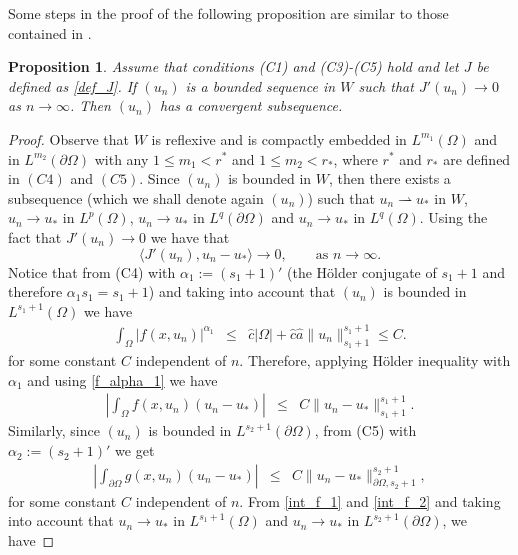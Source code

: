 \documentclass[pdflatex,sn-mathphys-num]{sn-jnl}
\theoremstyle{thmstyleone}%
\newtheorem{proposition}[theorem]{Proposition}%
\theoremstyle{thmstyletwo}%
\theoremstyle{thmstylethree}%
\theoremstyle{thmstylethree}%
\begin{document}
Some  steps in the proof of the following proposition are similar to those contained in \cite[Lemma 2.3]{CdFL}.
\begin{proposition}\label{bound-PS}
Assume that  conditions (C1) and (C3)-(C5) hold and let $J$ be defined as \eqref{def_J}. If $(u_n)$ is a bounded sequence in $W$ such  that $J'(u_n) \to 0$ as $n\to \infty$. Then  $(u_n)$ has a convergent subsequence.
\end{proposition}
\begin{proof}
    Observe that $W$ is reflexive  and is compactly embedded in $L^{m_1}(\Omega)$ and  in $ L^{m_2}(\partial\Omega)$ with any $1\le m_1<r^*$ and $1\le m_2<r_*$, where $r^*$ and $r_*$ are defined in $(C4)$ and $(C5)$. Since $(u_n)$ is bounded in $W$, then there exists a subsequence (which we shall denote again $(u_n)$) such that $u_n \rightharpoonup u_*$ in $W$, $u_n \to u_*$ in $L^p(\Omega)$, $u_n \to u_*$ in $L^q(\partial\Omega)$  and $u_n \to u_*$ in $L^q(\Omega)$.
 Using the fact that $J'(u_n)\to 0$ we have that 
 \begin{equation}\label{J'(u_n)}
     \langle J'(u_n), u_n-u_* \rangle \to 0,\qquad \text{as $n\to \infty$}.
 \end{equation}
Notice that from (C4)  with $\alpha_1:=(s_1+1)'$ (the Hölder conjugate of $s_1+1$ and therefore $\alpha_1 s_1=s_1+1$) and taking into account that $(u_n)$ is bounded in $L^{s_1+1}(\Omega)$ we have
 \begin{eqnarray}\label{f_alpha_1}
     \int_\Omega |f(x,u_n)|^{\alpha_1}  
     &\leqslant & \hat{c}|\Omega|+\hat{c}\hat{a}\|u_n\|_{s_1+1}^{s_1+1}\leqslant C. 
 \end{eqnarray}
 for some constant $C$ independent of $n$.
 Therefore, applying Hölder inequality with $\alpha_1$ and using \eqref{f_alpha_1} we have
 \begin{eqnarray}\label{int_f_1}
\left|     \int_{\Omega} f(x, u_n) (u_n-u_*)  \right| 
&\leqslant & C\|u_n-u_*\|_{s_1+1}^{s_1+1} .
 \end{eqnarray}
Similarly, since $(u_n)$ is bounded in $L^{s_2+1}(\partial \Omega)$, from (C5) with $\alpha_2:=(s_2+1)'$ we get 
 \begin{eqnarray}\label{int_f_2}
\left|     \int_{\partial\Omega} g(x, u_n) (u_n-u_*)  \right| 
&\leqslant & C\|u_n-u_*\|_{\partial\Omega, s_2+1}^{s_2+1}
,
 \end{eqnarray}
for some constant $C$ independent of $n$.
From \eqref{int_f_1}
 and \eqref{int_f_2}   and taking into account that $u_n \to u_*$ in $L^{s_1+1}(\Omega)$ and $u_n \to u_*$ in $L^{s_2+1}(\partial\Omega)$, we have  

\end{proof}
\end{document}
